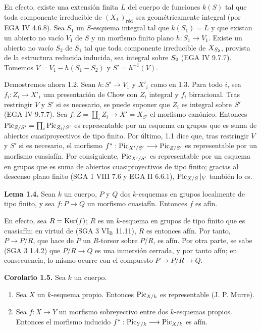 En efecto, existe una extensión finita \(L\) del cuerpo de funciones
\(k(S)\) tal que toda componente irreducible de
\((X_L)_{\text{réd}}\) sea geométricamente integral (por EGA IV 4.6.8). Sea
\(S_1\) un \(S\)-esquema integral tal que \(k(S_1)=L\) y que existan un
abierto no vacío \(V_1\) de \(S\) y un morfismo finito plano
\(h:S_1\to V_1\). Existe un abierto no vacío \(S_2\) de \(S_1\) tal que
toda componente irreducible de \(\sisi{X_{S_1}}{X_{S_2}}\), provista de la estructura %
reducida inducida, sea integral sobre \(\sisi{S_1}{S_2}\) (EGA IV 9.7.7). Tomemos
\(V=V_1-h(S_1-S_2)\) y \(S'=h^{-1}(V)\).

Demostremos ahora 1.2. Sean \(h:S'\to V_1\) y \(X'_i\) como en 1.3. Para
todo \(i\), sea \(f_i:Z_i\to X'_i\) una presentación de Chow con \(Z_i\)
integral y \(f_i\) birracional. Tras restringir \(V\) y \(S'\) si es
necesario, se puede suponer que \(Z_i\) es integral sobre \(\sisi{S}{S'}\) (EGA IV %
9.7.7). Sea \(f:Z=\coprod_i Z_i\longrightarrow X'=X_{S'}\) el morfismo
canónico. Entonces \(\Pic_{Z/S'}=\prod_i\Pic_{Z_i/S'}\) es representable por
un esquema en grupos que es suma de abiertos cuasiproyectivos de tipo finito.
Por último, 1.1 dice que, tras restringir \(V\) y \(S'\) si es necesario, el
morfismo \(f^*:\Pic_{X'/S'}\longrightarrow \Pic_{\sisi{Z'}{Z}/S'}\) es representable %
por un morfismo cuasiafín. Por consiguiente, \(\Pic_{X'/S'}\) es
representable por un esquema en grupos que es suma de abiertos
cuasiproyectivos de tipo finito; gracias al descenso plano finito (SGA 1 VIII
7.6 y EGA II 6.6.1), \(\Pic_{X/S}|_V\) también lo es.

\textbf{Lema 1.4.} Sean \(k\) un cuerpo, \(P\) y \(Q\) dos
\(k\)-esquemas en grupos localmente de tipo finito, y sea \(f:P\to Q\) un
morfismo cuasiafín. Entonces \(f\) es afín.

En efecto, sea \(R=\Ker(f)\); \(R\) es un \(k\)-esquema en grupos de tipo
finito que es cuasiafín; en virtud de (SGA 3
\(\mathrm{VI}_{\mathrm B}\) 11.11), \(R\) es entonces afín. Por tanto,
\(P\to P/R\), que hace de \(P\) un \(R\)-torsor sobre \(P/R\), es afín. Por
otra parte, se sabe (SGA 3 1.4.2) que \(P/R\to Q\) es una inmersión cerrada,
y por tanto afín; en consecuencia, lo mismo ocurre con el compuesto
\(P\to P/R\to Q\).

\textbf{Corolario 1.5.} Sea \(k\) un cuerpo.
\begin{enumerate}[label=\alph*)]
\item Sea \(X\) un \(k\)-esquema propio. Entonces \(\Pic_{X/k}\) es
representable (J. P. Murre).
\item Sea \(f:X\to Y\) un morfismo sobreyectivo entre dos \(k\)-esquemas
propios. Entonces el morfismo inducido
\(f^*:\Pic_{Y/k}\longrightarrow \Pic_{X/k}\) es afín.
\end{enumerate}

